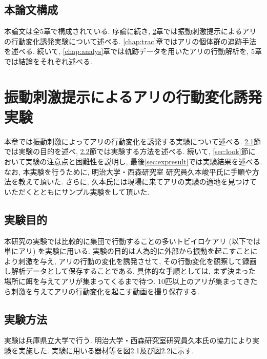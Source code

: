 ﻿\documentclass[a4paper, 12pt]{jsreport}
\begin{document}
\section{本論文構成}
\label{sec:struc}
本論文は全5章で構成されている. 序論に続き, \ref{chap:exp}章では振動刺激提示によるアリの行動変化誘発実験について述べる. \ref{chap:trac}章ではアリの個体群の追跡手法を述べる. 続いて, \ref{chap:analys}章では軌跡データを用いたアリの行動解析を, 5章では結論をそれぞれ述べる. 
\chapter{振動刺激提示によるアリの行動変化誘発実験}
\label{chap:exp}
本章では振動刺激によってアリの行動変化を誘発する実験について述べる. \ref{sec:expaim}節では実験の目的を述べ, \ref{sec:method}節では実験する方法を述べる. 続いて, \ref{sec:look}節において実験の注意点と困難性を説明し, 最後\ref{sec:expresult}では実験結果を述べる. 
なお, 本実験を行うために, 明治大学・西森研究室 研究員久本峻平氏に手順や方法を教えて頂いた. さらに, 久本氏には現場に来てアリの実験の適地を見つけていただくとともにサンプル実験をして頂いた. 
\section{実験目的}
\label{sec:expaim}
本研究の実験では比較的に集団で行動することの多いトビイロケアリ (以下では単にアリ) を実験に用いる. 
実験の目的は人為的に外部から振動を起こすことにより刺激を与え, アリの行動の変化を誘発させて, その行動変化を観察して録画し解析データとして保存することである. 
具体的な手順としては, まず決まった場所に餌を与えてアリが集まってくるまで待つ. 10匹以上のアリが集まってきたら刺激を与えてアリの行動変化を起こす動画を撮り保存する. 
\section{実験方法}
\label{sec:method}
実験は兵庫県立大学で行う. 明治大学・西森研究室研究員久本氏の協力により実験を実施した. 実験に用いる器材等を図2.1及び図2.2に示す. 
\end{document}
